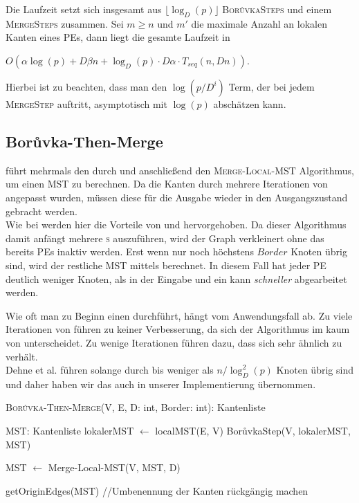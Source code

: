 Die Laufzeit setzt sich insgesamt aus $\lfloor \log_{D}(p) \rfloor$  \textsc{Bor{\r u}vkaSteps} und einem \textsc{MergeSteps} zusammen. Sei $m \geq n$ und $m'$ die maximale Anzahl an lokalen Kanten eines PEs, dann liegt die gesamte Laufzeit in 
\begin{center}
$O(\alpha \log(p) + D\beta n + \log_D(p) \cdot D\alpha \cdot T_{seq}(n,Dn))$.
\end{center} 
Hierbei ist zu beachten, dass man den $\log(p/D^i)$ Term, der bei jedem \textsc{MergeStep} auftritt, asymptotisch mit $\log(p)$ abschätzen kann.


\subsection{Bor{\r u}vka-Then-Merge}
\boruvkaThenMerge führt mehrmals den \boruvkaStep\space durch und anschließend den \textsc{Merge-Local-MST} Algorithmus, um einen MST zu berechnen. Da die Kanten durch mehrere Iterationen von \boruvkaAllreduce angepasst wurden, müssen diese für die Ausgabe wieder in den Ausgangszustand gebracht werden. \\
Wie bei \boruvkaMixedMerge werden hier die Vorteile von \boruvkaAllreduce und \mergeMST hervorgehoben.
Da dieser Algorithmus damit anfängt mehrere \boruvkaStep \textsc{s} auszuführen, wird der Graph verkleinert ohne das bereits PEs inaktiv werden. Erst wenn nur noch höchstens $Border$ Knoten übrig sind, wird der restliche MST mittels \mergeMST berechnet. In diesem Fall hat jeder PE deutlich weniger Knoten, als in der Eingabe und ein \mergeStep\space kann \emph{schneller} abgearbeitet werden.

Wie oft man zu Beginn einen \boruvkaStep \space durchführt, hängt vom Anwendungsfall ab. Zu viele Iterationen von \boruvkaAllreduce führen zu keiner Verbesserung, da sich der Algorithmus im kaum von \boruvkaAllreduce unterscheidet. Zu wenige Iterationen führen dazu, dass sich \boruvkaThenMerge sehr ähnlich zu \mergeMST verhält.\\
Dehne et al. \cite{dehne1998practical} führen \boruvka solange durch bis weniger als $n/\log_{D}^2(p)$ Knoten übrig sind und daher haben wir das auch in unserer Implementierung übernommen.



\begin{algorithm} 
\caption{\textsc{Bor{\r u}vka-Then-Merge}(V, E, D: int, Border: int): Kantenliste}
\begin{algorithmic}[1]
\label{Boruvka-Then-Merge-Algo}

\STATE MST: Kantenliste
\STATE lokalerMST $\gets$ localMST(E, V)
    \STATE Bor{\r u}vkaStep(V, lokalerMST, MST)
\ENDWHILE

\STATE MST $\gets$ Merge-Local-MST(V, MST, D)

\RETURN getOriginEdges(MST) //Umbenennung der Kanten rückgängig machen
\end{algorithmic}
\end{algorithm}





